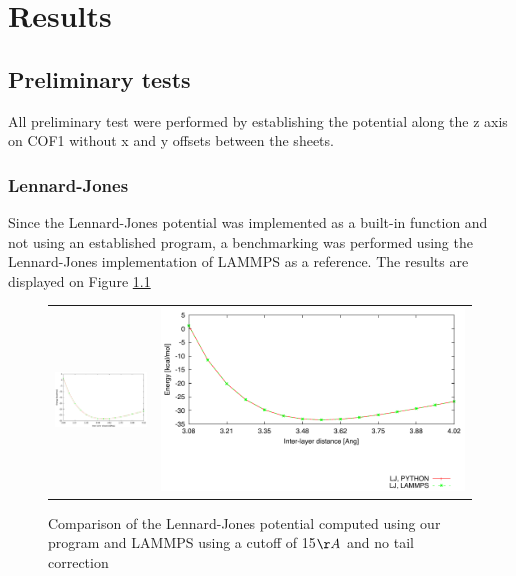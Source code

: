 
\chapter{Results}



\section{Preliminary tests}
All preliminary test were performed by establishing the potential along the z axis on COF1 without x and y offsets between the sheets.

\subsection{Lennard-Jones}
Since the Lennard-Jones potential was implemented as a built-in function and not using an established program, a benchmarking was performed using the Lennard-Jones implementation of LAMMPS as a reference. The results are displayed on Figure \ref{fig:lj_bench}

\begin{figure}%
\centering
\begin{tabular}{cr}
\includegraphics[width=6cm]{images/bench_lj.pdf}&  
\includegraphics{images/key_bench_lj.pdf}\\
\end{tabular}
\caption{Comparison of the Lennard-Jones potential computed using our program and LAMMPS using a cutoff of 15$\AA$  and no tail correction}
\label{fig:lj_bench}
\end{figure}

